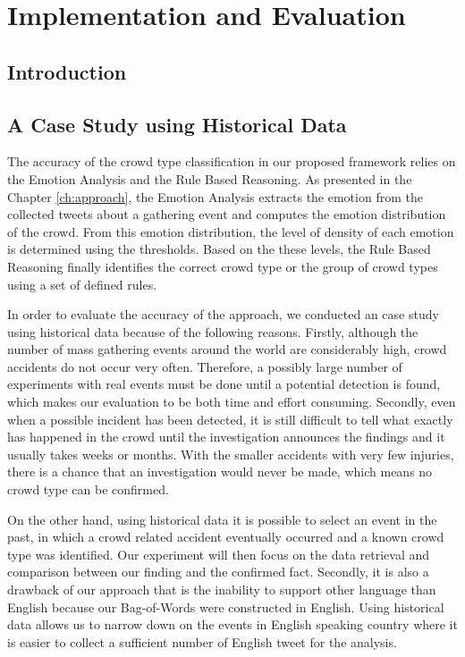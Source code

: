 \chapter{Implementation and Evaluation}
\label{ch:eval}
\ifpdf
    \graphicspath{{Chapter5/Figs/Raster/}{Chapter5/Figs/PDF/}{Chapter5/Figs/}}
\else
    \graphicspath{{Chapter5/Figs/Vector/}{Chapter5/Figs/}}
\fi

\section{Introduction}

\section{A Case Study using Historical Data}

The accuracy of the crowd type classification in our proposed framework relies on the Emotion Analysis and the Rule Based Reasoning. As presented in the Chapter \ref{ch:approach}, the Emotion Analysis extracts the emotion from the collected tweets about a gathering event and computes the emotion distribution of the crowd. From this emotion distribution, the level of density of each emotion is determined using the thresholds. Based on the these levels, the Rule Based Reasoning finally identifies the correct crowd type or the group of crowd types using a set of defined rules. 

In order to evaluate the accuracy of the approach, we conducted an case study using historical data because of the following reasons. Firstly, although the number of mass gathering events around the world are considerably high, crowd accidents do not occur very often. Therefore, a possibly large number of experiments with real events must be done until a potential detection is found, which makes our evaluation to be both time and effort consuming. Secondly, even when a possible incident has been detected, it is still difficult to tell what exactly has happened in the crowd until the investigation announces the findings and it usually takes weeks or months. With the smaller accidents with very few injuries, there is a chance that an investigation would never be made, which means no crowd type can be confirmed.

On the other hand, using historical data it is possible to select an event in the past, in which a crowd related accident eventually occurred and a known crowd type was identified. Our experiment will then focus on the data retrieval and comparison between our finding and the confirmed fact. Secondly, it is also a drawback of our approach that is the inability to support other language than English because our Bag-of-Words were constructed in English. Using historical data allows us to narrow down on the events in English speaking country where it is easier to collect a sufficient number of English tweet for the analysis.

